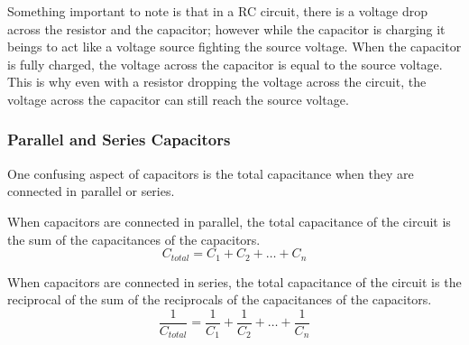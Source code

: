 \documentclass[a4paper, 10pt]{article}
\begin{document}
			Something important to note is that in a RC circuit, there is a voltage drop across the resistor and the capacitor;
			however while the capacitor is charging it beings to act like a voltage source fighting the source voltage.
			When the capacitor is fully charged, the voltage across the capacitor is equal to the source voltage.\\

			This is why even with a resistor dropping the voltage across the circuit, the voltage across the capacitor can still reach the source voltage.\\

			\pagebreak
			\subsubsection{Parallel and Series Capacitors}
				One confusing aspect of capacitors is the total capacitance when they are connected in parallel or series.
				
				When capacitors are connected in parallel, the total capacitance of the circuit is the sum of the capacitances of the capacitors.
				\begin{equation}
					C_{total} = C_1 + C_2 + \ldots + C_n
					\label{eq:parallel_capacitors}
				\end{equation}

				When capacitors are connected in series, the total capacitance of the circuit is the reciprocal of the sum of the reciprocals of the capacitances of the capacitors.
				\begin{equation}
					\frac{1}{C_{total}} = \frac{1}{C_1} + \frac{1}{C_2} + \ldots + \frac{1}{C_n}
					\label{eq:series_capacitors}
				\end{equation}
\end{document}
